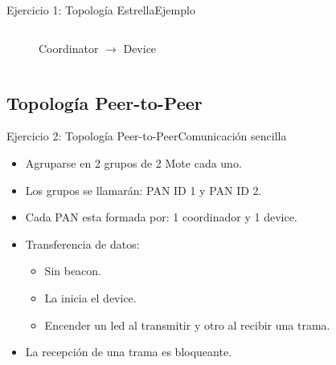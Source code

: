 \documentclass[aspectratio=169]{beamer}
\begin{document}
\begin{frame}[t]{Ejercicio 1: Topología Estrella}{Ejemplo}
\begin{columns}[t]
\begin{column}{.5\textwidth}
\begin{minipage}[t][0.7\textheight][s]{\columnwidth}
\begin{figure}[H]
                \vfill
                \caption{Coordinator $\rightarrow$ Device}
            \end{figure}            
        \end{minipage}
    \end{column}
\end{columns}          
\end{frame}



\subsection[Peer-to-Peer]{Topología Peer-to-Peer}
\begin{frame}[t]{Ejercicio 2: Topología Peer-to-Peer}{Comunicación sencilla}
    \begin{itemize}
        \item Agruparse en 2 grupos de 2 Mote cada uno.
        \vspace{5px}
        \item Los grupos se llamarán: PAN ID 1 y PAN ID 2.
        \vspace{5px}
        \item Cada PAN esta formada por: 1 coordinador y 1 device.
        \vspace{5px}
        \item Transferencia de datos:
            \begin{itemize}
            \item Sin beacon.
            \vspace{5px}
            \item La inicia el device.
            \vspace{5px}   
            \item Encender un led al transmitir y otro al recibir una trama.
            \vspace{5px}
            \end{itemize}
        \item La recepción de una trama es bloqueante.
        \vspace{5px}
    \end{itemize}
\end{frame}

\end{document}
